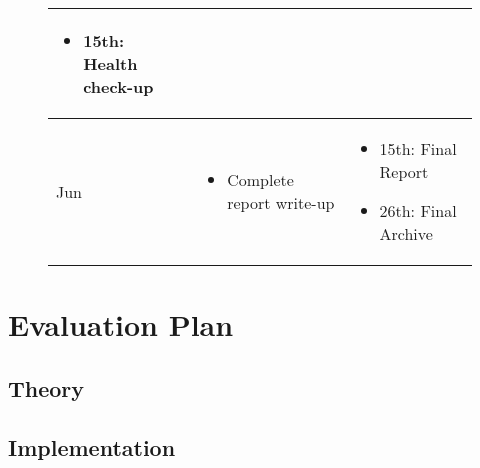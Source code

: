 \documentclass[12pt,twoside]{report}
\begin{document}
\begin{figure}
\begin{tabular}{l|p{}|p{}}
\begin{itemize}
\item 15th: Health check-up
\end{itemize}\\
\hline
Jun & \begin{itemize}
\item Complete report write-up
\end{itemize} & \begin{itemize}
\item 15th: Final Report
\item 26th: Final Archive
\end{itemize}
\end{tabular}
\label{table:timetable}
\end{figure}


\chapter{Evaluation Plan}
\section{Theory}
\section{Implementation}


\clearpage



\end{document}
